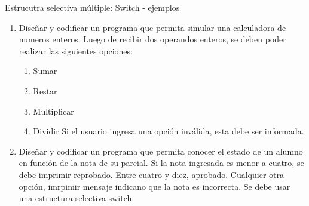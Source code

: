 \documentclass[xcolor=pdftex,table,11pt]{beamer}
\begin{document}
\begin{frame}{Estrucutra selectiva múltiple: Switch - ejemplos}
 \begin{enumerate}
   
     	\item Diseñar y codificar un programa que permita simular una calculadora de numeros enteros.
     	Luego de recibir dos operandos enteros, se deben poder realizar las siguientes opciones:
     	 \begin{enumerate}
     	 \item Sumar
		 \item Restar
		\item Multiplicar
		\item Dividir
	   	Si el usuario ingresa una opción inválida, esta debe ser informada.
     	 \end{enumerate}

\href{https://github.com/danis963/informaticaI_IUA/blob/main/c/src/1-3_switch_case_calculadora.c}{}



     	\item Diseñar y codificar un programa que permita conocer el estado de un alumno en función de la nota de su parcial. Si la nota ingresada es menor a cuatro, se debe imprimir reprobado. Entre cuatro y diez, aprobado. Cualquier otra opción, imrpimir mensaje indicano que la nota es incorrecta. Se debe usar una estructura selectiva switch.
     	
	\href{https://github.com/danis963/informaticaI_IUA/blob/main/c/src/1-3_switch_case_notas.c}{}

   
   \end{enumerate}
   

\end{frame}
\end{document}
